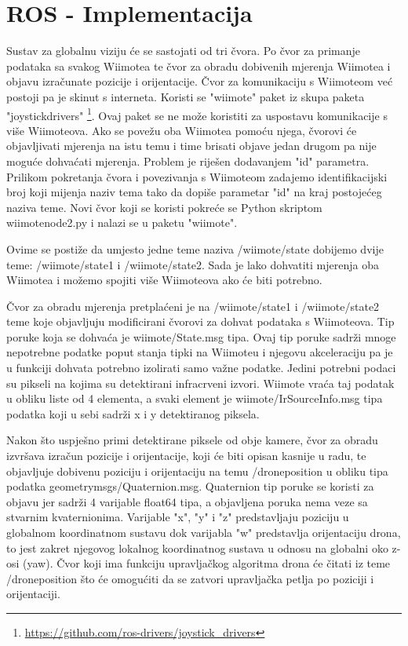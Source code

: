 \documentclass[times, utf8, diplomski]{fer}
\begin{document}
\section{ROS - Implementacija}
Sustav za globalnu viziju će se sastojati od tri čvora. Po čvor za primanje podataka sa svakog Wiimotea te čvor za obradu dobivenih mjerenja Wiimotea i objavu izračunate pozicije i orijentacije. Čvor za komunikaciju s Wiimoteom već postoji pa je skinut s interneta. Koristi se "wiimote" paket iz skupa paketa "joystick\textunderscore drivers" \footnote{\url{https://github.com/ros-drivers/joystick_drivers}}. Ovaj paket se ne može koristiti za uspostavu komunikacije s više Wiimoteova. Ako se povežu oba Wiimotea pomoću njega, čvorovi će objavljivati mjerenja na istu temu i time brisati objave jedan drugom pa nije moguće dohvaćati mjerenja. Problem je riješen dodavanjem "id" parametra. Prilikom pokretanja čvora i povezivanja s Wiimoteom zadajemo identifikacijski broj koji mijenja naziv tema tako da dopiše parametar "id" na kraj postojećeg naziva teme. Novi čvor koji se koristi pokreće se Python skriptom wiimote\textunderscore node2.py i nalazi se u paketu "wiimote".

Ovime se postiže da umjesto jedne teme naziva /wiimote/state dobijemo dvije teme: /wiimote/state1 i /wiimote/state2. Sada je lako dohvatiti mjerenja oba Wiimotea i možemo spojiti više Wiimoteova ako će biti potrebno.

Čvor za obradu mjerenja pretplaćeni je na /wiimote/state1 i /wiimote/state2 teme koje objavljuju modificirani čvorovi za dohvat podataka s Wiimoteova. Tip poruke koja se dohvaća je wiimote/State.msg tipa. Ovaj tip poruke sadrži mnoge nepotrebne podatke poput stanja tipki na Wiimoteu i njegovu akceleraciju pa je u funkciji dohvata potrebno izolirati samo važne podatke. Jedini potrebni podaci su pikseli na kojima su detektirani infracrveni izvori. Wiimote vraća taj podatak u obliku liste od 4 elementa, a svaki element je wiimote/IrSourceInfo.msg tipa podatka koji u sebi sadrži x i y detektiranog piksela.

Nakon što uspješno primi detektirane piksele od obje kamere, čvor za obradu izvršava izračun pozicije i orijentacije, koji će biti opisan kasnije u radu, te objavljuje dobivenu poziciju i orijentaciju na temu /drone\textunderscore position u obliku tipa podatka geometry\textunderscore msgs/Quaternion.msg. Quaternion tip poruke se koristi za objavu jer sadrži 4 varijable float64 tipa, a objavljena poruka nema veze sa stvarnim kvaternionima. Varijable "x", "y" i "z" predstavljaju poziciju u globalnom koordinatnom sustavu dok varijabla "w" predstavlja orijentaciju drona, to jest zakret njegovog lokalnog koordinatnog sustava u odnosu na globalni oko z-osi (yaw). Čvor koji ima funkciju upravljačkog algoritma drona će čitati iz teme /drone\textunderscore position što će omogućiti da se zatvori upravljačka petlja po poziciji i orijentaciji.
\end{document}
